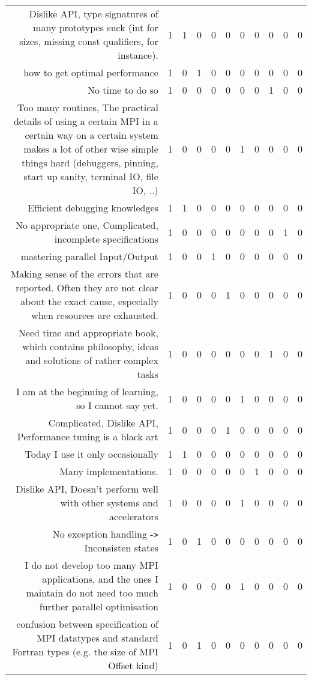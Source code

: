{\begin{landscape}
\begin{longtable}[htb]{r|c|c|c|c|c|c|c|c|c|c}
{Dislike API, type signatures of many prototypes suck (int for sizes, missing const qualifiers, for instance).} & 1 & 1 & 0 & 0 & 0 & 0 & 0 & 0 & 0 & 0 \\%
{how to get optimal performance} & 1 & 0 & 1 & 0 & 0 & 0 & 0 & 0 & 0 & 0 \\%
{No time to do so} & 1 & 0 & 0 & 0 & 0 & 0 & 0 & 1 & 0 & 0 \\%
{Too many routines, The practical details of using a certain MPI in a certain way on a certain system makes a lot of other wise simple things hard (debuggers, pinning, start up sanity, terminal IO, file IO, ..)} & 1 & 0 & 0 & 0 & 0 & 1 & 0 & 0 & 0 & 0 \\%
{Efficient debugging knowledges} & 1 & 1 & 0 & 0 & 0 & 0 & 0 & 0 & 0 & 0 \\%
{No appropriate one, Complicated, incomplete specifications} & 1 & 0 & 0 & 0 & 0 & 0 & 0 & 0 & 1 & 0 \\%
{mastering parallel Input/Output} & 1 & 0 & 0 & 1 & 0 & 0 & 0 & 0 & 0 & 0 \\%
{Making sense of the errors that are reported. Often they are not clear about the exact cause, especially when resources are exhausted.} & 1 & 0 & 0 & 0 & 1 & 0 & 0 & 0 & 0 & 0 \\%
{Need time and appropriate book, which contains philosophy, ideas and solutions of rather complex tasks} & 1 & 0 & 0 & 0 & 0 & 0 & 0 & 1 & 0 & 0 \\%
{I am at the beginning of learning, so I cannot say yet.} & 1 & 0 & 0 & 0 & 0 & 1 & 0 & 0 & 0 & 0 \\%
{Complicated, Dislike API, Performance tuning is a black art} & 1 & 0 & 0 & 0 & 1 & 0 & 0 & 0 & 0 & 0 \\%
{Today I use it only occasionally} & 1 & 1 & 0 & 0 & 0 & 0 & 0 & 0 & 0 & 0 \\%
{Many implementations.} & 1 & 0 & 0 & 0 & 0 & 0 & 1 & 0 & 0 & 0 \\%
{Dislike API, Doesn't perform well with other systems and accelerators} & 1 & 0 & 0 & 0 & 0 & 1 & 0 & 0 & 0 & 0 \\%
{No exception handling -\verb!>! Inconsisten states} & 1 & 0 & 1 & 0 & 0 & 0 & 0 & 0 & 0 & 0 \\%
{I do not develop too many MPI applications, and the ones I maintain do not need too much further parallel optimisation} & 1 & 0 & 0 & 0 & 0 & 1 & 0 & 0 & 0 & 0 \\%
{confusion between specification of MPI datatypes and standard Fortran types (e.g. the size of MPI Offset kind)} & 1 & 0 & 1 & 0 & 0 & 0 & 0 & 0 & 0 & 0 \\%

\end{longtable}
\end{landscape}}
